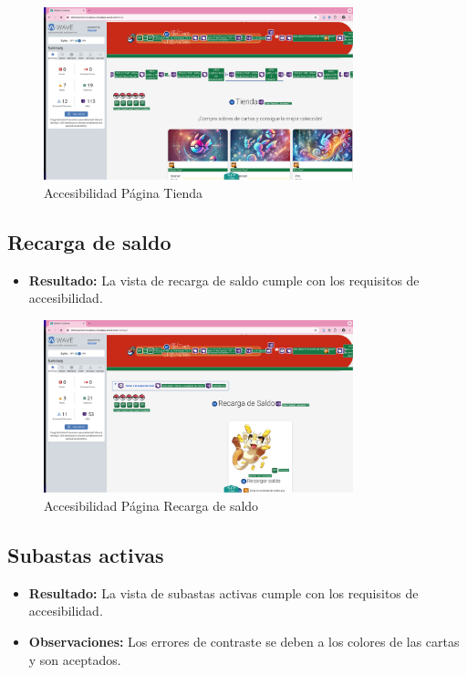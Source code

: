 \begin{figure}[H]
    \centering
    \includegraphics[width=0.8\textwidth]{figures/accesibilidad/A-acc-tienda.png}
    \caption{Accesibilidad Página Tienda}
    \label{fig:Acc-Tienda}
\end{figure}

\subsection*{Recarga de saldo}
\begin{itemize}
    \item \textbf{Resultado:} La vista de recarga de saldo cumple con los requisitos de accesibilidad.
\end{itemize}

\begin{figure}[H]
    \centering
    \includegraphics[width=0.8\textwidth]{figures/accesibilidad/A-acc-recarga.png}
    \caption{Accesibilidad Página Recarga de saldo}
    \label{fig:Acc-Recarga}
\end{figure}

\subsection*{Subastas activas}
\begin{itemize}
    \item \textbf{Resultado:} La vista de subastas activas cumple con los requisitos de accesibilidad.
    \item \textbf{Observaciones:} Los errores de contraste se deben a los colores de las cartas y son aceptados.
\end{itemize}

